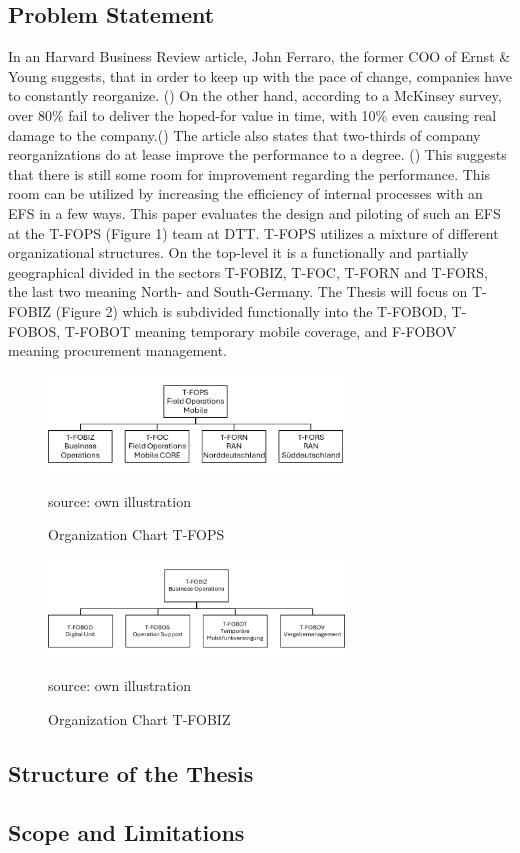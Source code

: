 \subsection{Problem Statement}
In an Harvard Business Review article, John Ferraro, the former COO of Ernst \& Young suggests, that in order to keep up with the pace of change, companies have 
to constantly reorganize. (\cite{heidari-robinson_getting_2016}) On the other hand, according to a McKinsey survey, over 80\% fail to deliver the hoped-for value in time, with 10\% even causing real 
damage to the company.(\cite{heidari-robinson_getting_2016}) The article also states that two-thirds of company reorganizations do at lease improve the performance to a degree. (\cite{heidari-robinson_getting_2016}) This suggests that 
there is still some room for improvement regarding the performance. 
This room can be utilized by increasing the efficiency of internal processes with an \ac{EFS} in a few ways. 
This paper evaluates the design and piloting of such an \ac{EFS} at the \ac{T-FOPS} (Figure 1) team at \ac{DTT}. 
\ac{T-FOPS} utilizes a mixture of different organizational structures. On the top-level it is a functionally and partially geographical divided in the sectors 
\ac{T-FOBIZ}, \ac{T-FOC}, \ac{T-FORN} and \ac{T-FORS}, the last two meaning North- and 
South-Germany. The Thesis will focus on \ac{T-FOBIZ} (Figure 2) which is subdivided functionally into the \ac{T-FOBOD}, \ac{T-FOBOS}, 
\ac{T-FOBOT} meaning temporary mobile coverage, and \ac{F-FOBOV} meaning procurement management. 

\begin{figure}[H]
    \centering
    \includegraphics[width=0.7\textwidth]{abbildungen/FopsOrga}
    \caption{Organization Chart \ac{T-FOPS}}
    \label{fig:FopsOrga}
    source: own illustration
\end{figure}
\begin{figure}[H]
    \centering
    \includegraphics[width=0.7\textwidth]{abbildungen/FobizOrga}
    \caption{Organization Chart \ac{T-FOBIZ}}
    \label{fig:FobizOrga}
    source: own illustration
\end{figure}

\subsection{Structure of the Thesis}

\subsection{Scope and Limitations}


